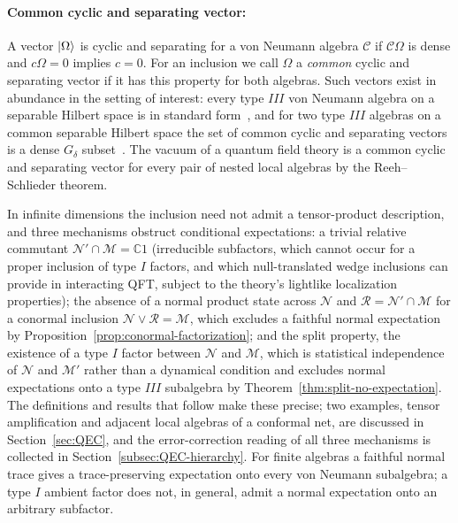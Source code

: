 \documentclass[a4paper,11pt]{article}
\theoremstyle{definition}
\begin{document}
\paragraph{Common cyclic and separating vector:} A vector $\ket\Omega$ is cyclic and separating for a von Neumann algebra $\mathcal C$
if $\mathcal C\Omega$ is dense and $c\Omega=0$ implies $c=0$. For an inclusion we
call $\Omega$ a \emph{common} cyclic and separating vector if it has this property
for both algebras. Such vectors exist in abundance in the setting of interest:
every type $III$ von Neumann algebra on a separable Hilbert space is in standard
form~\cite{Blackadar2006}, and for two type $III$ algebras on a common separable
Hilbert space the set of common cyclic and separating vectors is a dense $G_\delta$
subset~\cite{dixmiermarechal}. The vacuum of a quantum field theory is a common
cyclic and separating vector for every pair of nested local algebras by the
Reeh--Schlieder theorem.

In infinite dimensions the inclusion need not admit a tensor-product description, and three mechanisms obstruct conditional expectations: a trivial relative commutant $\mathcal N'\cap\mathcal M=\mathbb C1$ (irreducible subfactors, which cannot occur for a proper inclusion of type $I$ factors, and which null-translated wedge inclusions can provide in interacting QFT, subject to the theory's lightlike localization properties); the absence of a normal product state across $\mathcal N$ and $\mathcal R=\mathcal N'\cap\mathcal M$ for a conormal inclusion $\mathcal N\vee\mathcal R=\mathcal M$, which excludes a faithful normal expectation by Proposition~\ref{prop:conormal-factorization}; and the split property, the existence of a type $I$ factor between $\mathcal N$ and $\mathcal M$, which is statistical independence of $\mathcal N$ and $\mathcal M'$ rather than a dynamical condition and excludes normal expectations onto a type $III$ subalgebra by Theorem~\ref{thm:split-no-expectation}. The definitions and results that follow make these precise; two examples, tensor amplification and adjacent local algebras of a conformal net, are discussed in Section~\ref{sec:QEC}, and the error-correction reading of all three mechanisms is collected in Section~\ref{subsec:QEC-hierarchy}. For finite algebras a faithful normal trace gives a trace-preserving expectation onto every von Neumann subalgebra; a type $I$ ambient factor does not, in general, admit a normal expectation onto an arbitrary subfactor.
\end{document}
